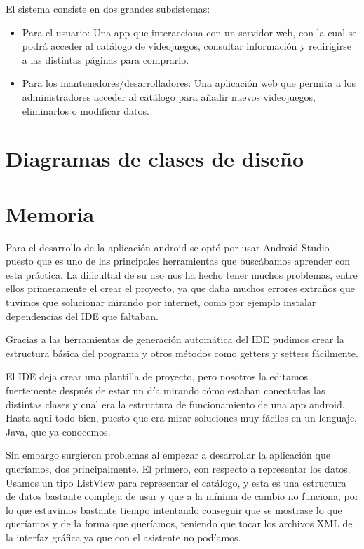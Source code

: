 \documentclass[11pt, spanish]{article}
\begin{document}
El sistema consiste en dos grandes subsistemas:

\begin{itemize}
\item Para el usuario: Una app que interacciona con un servidor web, con la cual se podrá acceder al catálogo de videojuegos, consultar información y redirigirse a las distintas páginas para comprarlo.
\item Para los mantenedores/desarrolladores: Una aplicación web que permita a los administradores acceder al catálogo para añadir nuevos videojuegos, eliminarlos o modificar datos.
\end{itemize}

\begin{center}
\end{center}

\section{Diagramas de clases de diseño}

\begin{center}
\end{center}

\section{Memoria}

Para el desarrollo de la aplicación android se optó por usar Android Studio puesto que es uno de las principales herramientas que buscábamos aprender con esta práctica. La dificultad de su uso nos ha hecho tener muchos problemas, entre ellos primeramente el crear el proyecto, ya que daba muchos errores extraños que tuvimos que solucionar mirando por internet, como por ejemplo instalar dependencias del IDE que faltaban.

Gracias a las herramientas de generación automática del IDE pudimos crear la estructura básica del programa y otros métodos como getters y setters fácilmente.

El IDE deja crear una plantilla de proyecto, pero nosotros la editamos fuertemente después de estar un día mirando cómo estaban conectadas las distintas clases y cual era la estructura de funcionamiento de una app android. Hasta aquí todo bien, puesto que era mirar soluciones muy fáciles en un lenguaje, Java, que ya conocemos.

Sin embargo surgieron problemas al empezar a desarrollar la aplicación que queríamos, dos principalmente. El primero, con respecto a representar los datos. Usamos un tipo ListView para representar el catálogo, y esta es una estructura de datos bastante compleja de usar y que a la mínima de cambio no funciona, por lo que estuvimos bastante tiempo intentando conseguir que se mostrase lo que queríamos y de la forma que queríamos, teniendo que tocar los archivos XML de la interfaz gráfica ya que con el asistente no podíamos.
\end{document}
